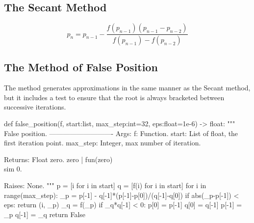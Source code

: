 \subsection{The Secant Method}
\[
p_n=p_{n-1}-\frac{f(p_{n-1})(p_{n-1}-p_{n-2})}{f(p_{n-1})-f(p_{n-2})}
\]

\subsection{The Method of False Position}
The method generates approximations in the same manner as the Secant method, but it includes a test to ensure that the root is always bracketed between successive iterations.
\begin{python}
def false_position(f, start:list, max_step:int=32, eps:float=1e-6) -> float:
    """
    False position.
    ----------------------------
    Args:
        f: Function.
        start: List of float, the first iteration point.
        max_step: Integer, max number of iteration.

    Returns:
        Float zero.
        zero | fun(zero)\\sim 0.

    Raises:
        None.
    """
    p = [i    for i in start]
    q = [f(i) for i in start]
    for i in range(max_step):
        _p = p[-1] - q[-1]*(p[-1]-p[0])/(q[-1]-q[0])
        if abs(_p-p[-1]) < eps:
            return (i, _p)
        _q = f(_p)
        if _q*q[-1] < 0:
            p[0] = p[-1]
            q[0] = q[-1]
        p[-1] = _p
        q[-1] = _q
    return False
\end{python}
